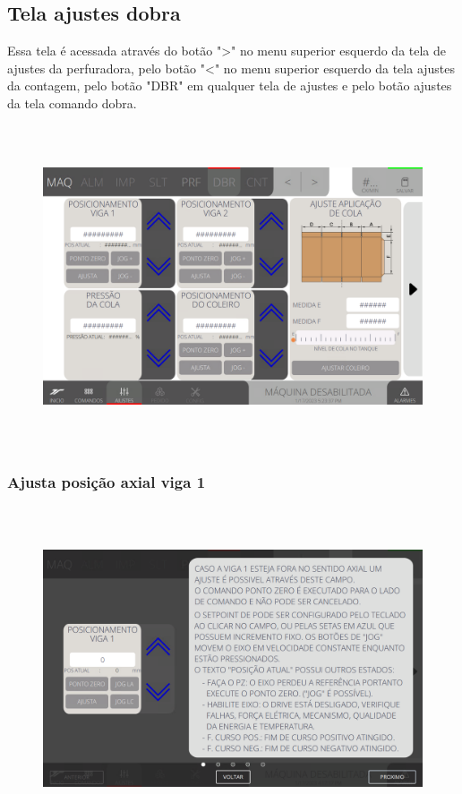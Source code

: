 \thispagestyle{fancy}
\vspace*{\fill}
\subsection{Tela ajustes dobra}
Essa tela é acessada através do botão "\textgreater" no menu superior esquerdo da tela de ajustes da perfuradora, pelo botão "\textless{}" no menu superior esquerdo
da tela ajustes da contagem, pelo botão "DBR" em qualquer tela de ajustes e pelo botão ajustes da tela comando dobra.
\begin{figure}[h]
  \centering
  \includegraphics[width=576px,height=360px]{src/imagesFlexo/07-fold/settings/e-Tela-Principal.png}
\end{figure}

\newpage
\thispagestyle{fancy}
\vspace*{\fill}
\subsubsection{\small{Ajusta posição axial viga 1}}
\begin{figure}[h]
  \centering
  \includegraphics[width=576px,height=360px]{src/imagesFlexo/07-fold/settings/e-1.png}
\end{figure}
\vspace*{\fill}

